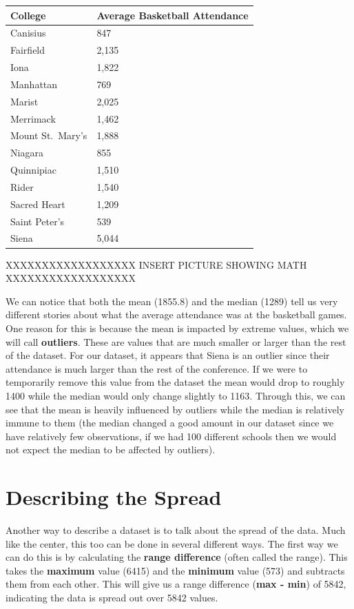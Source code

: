 \documentclass[
  letterpaper,
  DIV=11,
  numbers=noendperiod]{scrreprt}
\begin{document}
\begin{longtable}[]{@{}ll@{}}
\toprule\noalign{}
College & Average Basketball Attendance \\
\midrule\noalign{}
\endhead
\bottomrule\noalign{}
\endlastfoot
Canisius & 847 \\
Fairfield & 2,135 \\
Iona & 1,822 \\
Manhattan & 769 \\
Marist & 2,025 \\
Merrimack & 1,462 \\
Mount St.~Mary's & 1,888 \\
Niagara & 855 \\
Quinnipiac & 1,510 \\
Rider & 1,540 \\
Sacred Heart & 1,209 \\
Saint Peter's & 539 \\
Siena & 5,044 \\
\end{longtable}

XXXXXXXXXXXXXXXXXX INSERT PICTURE SHOWING MATH XXXXXXXXXXXXXXXXXX

We can notice that both the mean (1855.8) and the median (1289) tell us
very different stories about what the average attendance was at the
basketball games. One reason for this is because the mean is impacted by
extreme values, which we will call \textbf{outliers}. These are values
that are much smaller or larger than the rest of the dataset. For our
dataset, it appears that Siena is an outlier since their attendance is
much larger than the rest of the conference. If we were to temporarily
remove this value from the dataset the mean would drop to roughly 1400
while the median would only change slightly to 1163. Through this, we
can see that the mean is heavily influenced by outliers while the median
is relatively immune to them (the median changed a good amount in our
dataset since we have relatively few observations, if we had 100
different schools then we would not expect the median to be affected by
outliers).

\section{Describing the Spread}\label{describing-the-spread}

Another way to describe a dataset is to talk about the spread of the
data. Much like the center, this too can be done in several different
ways. The first way we can do this is by calculating the \textbf{range
difference} (often called the range). This takes the \textbf{maximum}
value (6415) and the \textbf{minimum} value (573) and subtracts them
from each other. This will give us a range difference (\textbf{max -
min}) of 5842, indicating the data is spread out over 5842 values.
\end{document}
